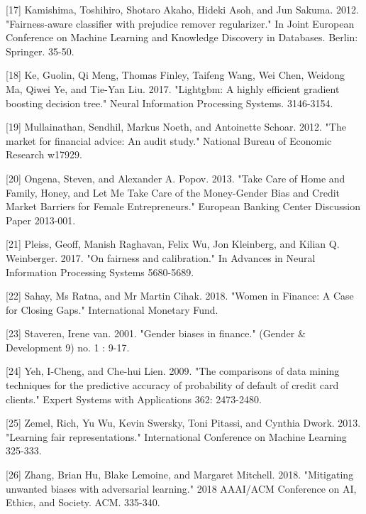 \documentclass{article}
\begin{document}
[17] Kamishima, Toshihiro, Shotaro Akaho, Hideki Asoh, and Jun Sakuma. 2012. "Fairness-aware classifier with prejudice remover regularizer." In Joint European Conference on Machine Learning and Knowledge Discovery in Databases. Berlin: Springer. 35-50.

[18] Ke, Guolin, Qi Meng, Thomas Finley, Taifeng Wang, Wei Chen, Weidong Ma, Qiwei Ye, and Tie-Yan Liu. 2017. "Lightgbm: A highly efficient gradient boosting decision tree." Neural Information Processing Systems. 3146-3154.

[19] Mullainathan, Sendhil, Markus Noeth, and Antoinette Schoar. 2012. "The market for financial advice: An audit study." National Bureau of Economic Research w17929.

[20] Ongena, Steven, and Alexander A. Popov. 2013. "Take Care of Home and Family, Honey, and Let Me Take Care of the Money-Gender Bias and Credit Market Barriers for Female Entrepreneurs." European Banking Center Discussion Paper 2013-001.

[21] Pleiss, Geoff, Manish Raghavan, Felix Wu, Jon Kleinberg, and Kilian Q. Weinberger. 2017. "On fairness and calibration." In Advances in Neural Information Processing Systems 5680-5689.

[22] Sahay, Ms Ratna, and Mr Martin Cihak. 2018. "Women in Finance: A Case for Closing Gaps." International Monetary Fund. 

[23] Staveren, Irene van. 2001. "Gender biases in finance." (Gender \& Development 9) no. 1 : 9-17.

[24] Yeh, I-Cheng, and Che-hui Lien. 2009. "The comparisons of data mining techniques for the predictive accuracy of probability of default of credit card clients." Expert Systems with Applications 362: 2473-2480.

[25] Zemel, Rich, Yu Wu, Kevin Swersky, Toni Pitassi, and Cynthia Dwork. 2013. "Learning fair representations." International Conference on Machine Learning 325-333.

[26] Zhang, Brian Hu, Blake Lemoine, and Margaret Mitchell. 2018. "Mitigating unwanted biases with adversarial learning." 2018 AAAI/ACM Conference on AI, Ethics, and Society. ACM. 335-340.
\end{document}
